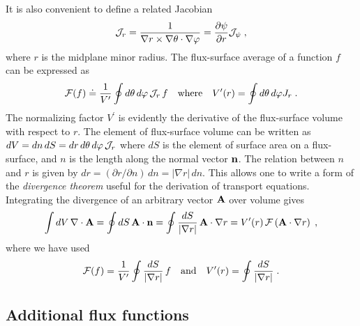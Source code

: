 It is also convenient to define a related 
Jacobian 
%
\begin{equation}
{\mathcal J}_r = \frac{1}{\nabla r \times\nabla\theta\cdot\nabla\varphi} 
= \frac{\partial \psi}{\partial r} {\mathcal J}_\psi \; ,
\end{equation}
%
where $r$ is the midplane minor radius.  The flux-surface average of 
a function $f$ can be expressed as
%
\begin{equation}
{\cal F}(f)  \doteq \frac{1}{V^\prime} \oint d\theta \, d\varphi \,{\mathcal J}_r \, f 
\quad\mbox{where}\quad V^\prime(r) = \oint d\theta \, d\varphi J_r \; .
\end{equation}
%
The normalizing factor $V^\prime$ is evidently the derivative 
of the flux-surface volume with respect to $r$.  The element 
of flux-surface volume can be written as $dV = dn\, dS = dr\,d\theta \, d\varphi\,{\mathcal J}_r$
where $dS$ is the element of surface area on a flux-surface, 
and $n$ is the length along the normal vector ${\bf n}$. 
The relation between $n$ and $r$ is given by $dr = 
(\partial r/\partial n) \, dn = |\nabla r| \, dn$.
This allows one to write a form of the {\it divergence theorem}
useful for the derivation of transport equations.  Integrating 
the divergence of an arbitrary vector ${\bf A}$ over volume 
gives
%
\begin{equation}
\int dV \, \nabla \cdot {\bf A} = 
 \oint dS \, {\bf A} \cdot {\bf n} =
 \oint \frac{dS}{|\nabla r|} \, {\bf A} \cdot \nabla r =
  V^\prime(r) \, {\cal F}\left( {\bf A}\cdot\nabla r \right) \; ,
\end{equation}
%
where we have used
%
\begin{equation}
{\cal F}(f)  = \frac{1}{V^\prime} \oint 
 \frac{dS}{|\nabla r|} \, f  \quad\mbox{and}\quad
V^\prime(r) = \oint \frac{dS}{|\nabla r|} \; .
\end{equation}

\subsection{Additional flux functions}

